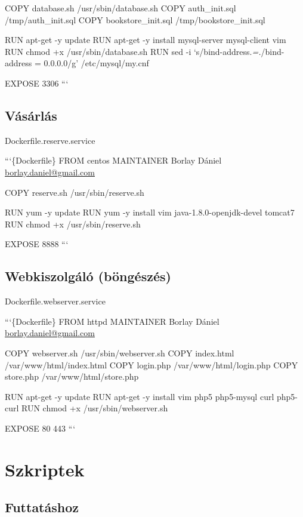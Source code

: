 COPY database.sh /usr/sbin/database.sh COPY auth\_init.sql
/tmp/auth\_init.sql COPY bookstore\_init.sql /tmp/bookstore\_init.sql

RUN apt-get -y update RUN apt-get -y install mysql-server mysql-client
vim RUN chmod +x /usr/sbin/database.sh RUN sed -i
`s/bind-address.\emph{=.}/bind-address = 0.0.0.0/g' /etc/mysql/my.cnf

EXPOSE 3306 ```

\subsection{Vásárlás}\label{vuxe1suxe1rluxe1s}

Dockerfile.reserve.service

```\{Dockerfile\} FROM centos MAINTAINER Borlay Dániel
\href{mailto:borlay.daniel@gmail.com}{borlay.daniel@gmail.com}

COPY reserve.sh /usr/sbin/reserve.sh

RUN yum -y update RUN yum -y install vim java-1.8.0-openjdk-devel
tomcat7 RUN chmod +x /usr/sbin/reserve.sh

EXPOSE 8888 ```

\subsection{Webkiszolgáló
(böngészés)}\label{webkiszolguxe1luxf3-buxf6nguxe9szuxe9s}

Dockerfile.webserver.service

```\{Dockerfile\} FROM httpd MAINTAINER Borlay Dániel
\href{mailto:borlay.daniel@gmail.com}{borlay.daniel@gmail.com}

COPY webserver.sh /usr/sbin/webserver.sh COPY index.html
/var/www/html/index.html COPY login.php /var/www/html/login.php COPY
store.php /var/www/html/store.php

RUN apt-get -y update RUN apt-get -y install vim php5 php5-mysql curl
php5-curl RUN chmod +x /usr/sbin/webserver.sh

EXPOSE 80 443 ```

\section{Szkriptek}\label{szkriptek}

\subsection{Futtatáshoz}\label{futtatuxe1shoz}

